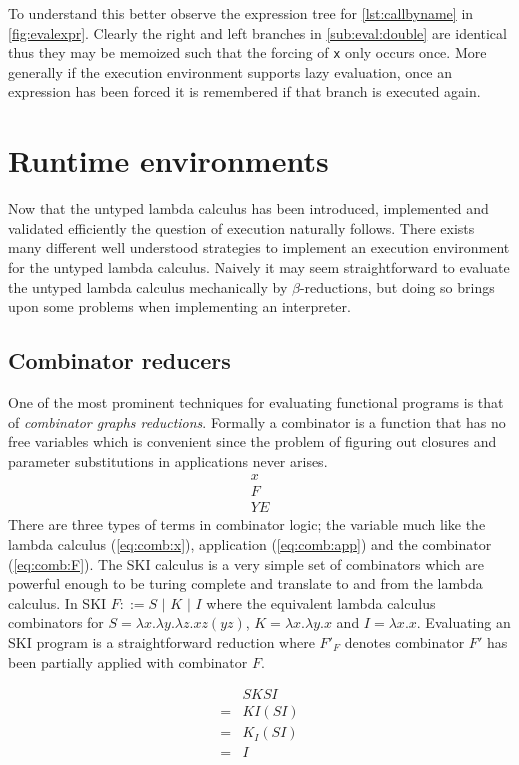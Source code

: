 \documentclass[11pt,oneside,a4paper]{report}
\begin{document}
To understand this better observe the expression tree for \autoref{lst:callbyname} in \autoref{fig:evalexpr}.
Clearly the right and left branches in \autoref{sub:eval:double} are identical thus they may be memoized such that the forcing of \texttt{x} only occurs once.
More generally if the execution environment supports lazy evaluation, once an expression has been forced it is remembered if that branch is executed again.

\section{Runtime environments}
Now that the untyped lambda calculus has been introduced, implemented and validated efficiently the question of execution naturally follows.
There exists many different well understood strategies to implement an execution environment for the untyped lambda calculus.
Naively it may seem straightforward to evaluate the untyped lambda calculus mechanically by $\beta$-reductions, but doing so brings upon some problems when implementing an interpreter.

\subsection{Combinator reducers}
\label{sec:comb}
One of the most prominent techniques for evaluating functional programs is that of \textit{combinator graphs reductions}.
Formally a combinator is a function that has no free variables which is convenient since the problem of figuring out closures and parameter substitutions in applications never arises.
\begin{align}
    x \label{eq:comb:x}\\
    F \label{eq:comb:F}\\
    Y E \label{eq:comb:app}
\end{align}
There are three types of terms in combinator logic; the variable much like the lambda calculus (\autoref{eq:comb:x}), application (\autoref{eq:comb:app}) and the combinator (\autoref{eq:comb:F}).
The SKI calculus is a very simple set of combinators which are powerful enough to be turing complete and translate to and from the lambda calculus.
In SKI $F ::= S \,\,|\,\, K \,\,|\,\, I$ where the equivalent lambda calculus combinators for $S = \lambda x . \lambda y . \lambda z . x z (y z)$, $K = \lambda x . \lambda y . x$ and $I = \lambda x . x$.
Evaluating an SKI program is a straightforward reduction where $F'_F$ denotes combinator $F'$ has been partially applied with combinator $F$.
\begin{exmp}
    \begin{align}
        &SKSI\\
        = &KI(SI)\tag*{}\\
        = &K_I(SI)\tag*{}\\
        = &I\tag*{}
    \end{align}
\end{exmp}
\end{document}
